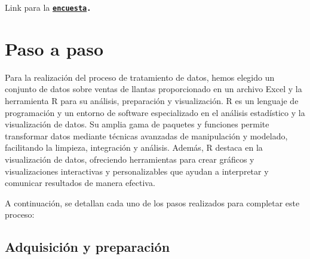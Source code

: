 \documentclass[12pt]{article}
\begin{document}
    Link para la \texttt{\textbf{\href{https://docs.google.com/forms/d/e/1FAIpQLSfqX3hlz6KKEy3PdoWKuSmd8aaH2FvSwmvK5ErNoTeH5opCoQ/viewform?usp=sf_link}{encuesta}.}}

    \newpage
    \section{Paso a paso}
    
        Para la realización del proceso de tratamiento de datos, hemos elegido un conjunto de datos sobre ventas de llantas proporcionado en un archivo Excel y la herramienta R para su análisis, preparación y visualización. R es un lenguaje de programación y un entorno de software especializado en el análisis estadístico y la visualización de datos. Su amplia gama de paquetes y funciones permite transformar datos mediante técnicas avanzadas de manipulación y modelado, facilitando la limpieza, integración y análisis. Además, R destaca en la visualización de datos, ofreciendo herramientas para crear gráficos y visualizaciones interactivas y personalizables que ayudan a interpretar y comunicar resultados de manera efectiva. 
        
        A continuación, se detallan cada uno de los pasos realizados para completar este proceso:

        \subsection{Adquisición y preparación}
            
\end{document}
